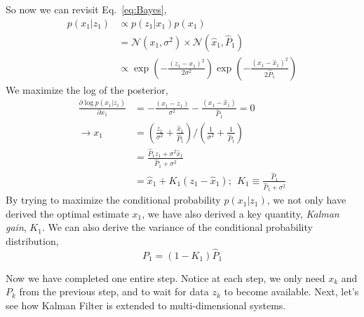 \documentclass{article}
\newcommand{\pt}{\partial}
\begin{document}
So now we can revisit Eq.~\ref{eq:Bayes},
\begin{equation}
\begin{aligned}
p(x_1 | z_1) & \propto p(z_1 | x_1) p(x_1) \\
&=  \mathcal{N} (x_1, \sigma^2) \times \mathcal{N} (\hat x_1, \hat P_1)\\
&\propto \exp \left(- \frac{(z_1- x_1)^2}{2\sigma^2} \right) \exp \left (-\frac{(x_1 - \hat x_1)^2}{2\hat P_1}\right)
\end{aligned}
\end{equation}
We maximize the log of the posterior,
\begin{equation}
\begin{aligned}
\frac{\pt \log p(x_1 | z_1)}{\pt x_1} & = - \frac{(x_1 - z_1)}{\sigma^2} - \frac{(x_1 - \hat x_1)}{\hat P_1} = 0 \\
\to x_1 &= \left (\frac{z_1}{\sigma^2} + \frac{\hat x_1}{\hat P_1} \right) \bigg / \left( \frac{1}{\sigma^2} + \frac{1}{\hat P_1} \right)\\
&= \frac{\hat P_1 z_1 + \sigma^2 \hat x_1}{\hat P_1 + \sigma^2}\\
& = \hat x_1 + K_1 (z_1 - \hat x_1); ~~K_1 \equiv \frac{\hat P_1}{\hat P_1 + \sigma^2}
\end{aligned}
\end{equation}
By trying to maximize the conditional probability $p(x_1 | z_1)$, we not only have derived the optimal estimate $x_1$, we have also derived a key quantity, \textit{Kalman gain}, $K_1$.
We can also derive the variance of the conditional probability distribution, 
\begin{equation}
 P_1 = (1-K_1) \hat P_1
 \end{equation}
\iffalse 
, by defining random variable $X= (1 - K_1) \hat x_1$, $Z = K_1 z_1$, 
and $Y = X+Z$, using the covariance formula,
\begin{equation}
\begin{aligned}
var(Y) & = cov(Y, Y) = cov(X+Z, X+Z) \\
& = cov(X,X) + cov(Z, Z) + 2cov(X,Z) \\
& = (1-K_1)^2 \hat P_1 + K_1^2 \sigma^2 \\
& = \frac{ \hat P_1 \sigma^4 + \hat P_1^2 \sigma^2 }{ (\hat P_1 + \sigma^2)^2 } = \frac{\hat P_1 \sigma^2 (\sigma^2 + \hat P_1 )}{(\hat P_1 + \sigma^2)^2} \\
& =(1-K_1) \hat P_1 \equiv P_1
\end{aligned}
\end{equation}
\fi
Now we have completed one entire step. Notice at each step, we only need $x_k$ and $P_k$ from the previous step, and to wait for data $z_k$ to become available.
Next, let's see how Kalman Filter is extended to multi-dimensional systems.
\end{document}

